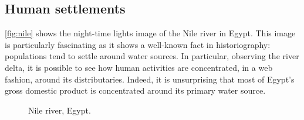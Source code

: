 \subsection{Human settlements}
 \autoref{fig:nile} shows the night-time lights image of the Nile river in Egypt. This image is particularly fascinating as it shows a well-known fact in historiography: populations tend to settle around water sources.
 In particular, observing the river delta, it is possible to see how human activities are concentrated, in a web fashion, around its distributaries.
 Indeed, it is unsurprising that most of Egypt's gross domestic product is concentrated around its primary water source.
\begin{figure}[h!]
    \hspace*{-2.8cm}
    \centering
    \caption{Nile river, Egypt.}%
    \label{fig:nile}
\end{figure}

